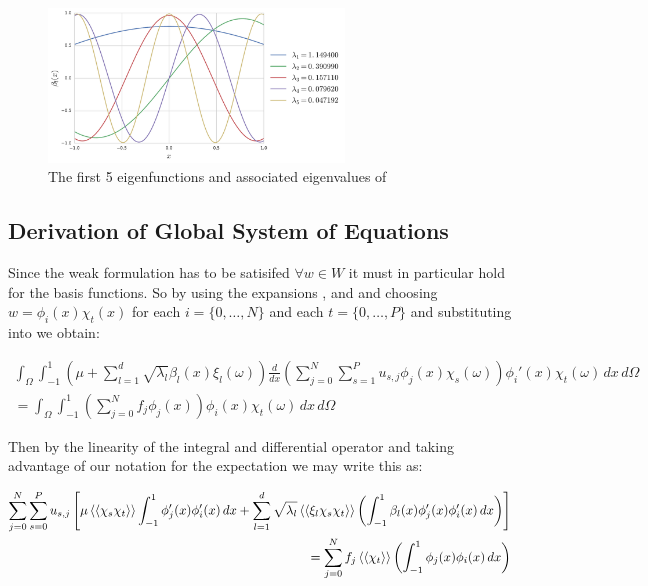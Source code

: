 \begin{figure}
    \centering
    \includegraphics[width=0.7\textwidth]{img/kle-eigenfunctions.pdf}
    \caption{The first 5 eigenfunctions and associated eigenvalues of
             }
    \label{fig:kle-eigenfunctions}
\end{figure}

\subsection{Derivation of Global System of Equations}

Since the weak formulation  has to be satisifed
$\forall w \in W$ it must in particular hold for the basis functions. So by
using the expansions ,
 and  and
choosing $w = \phi_i(x)\chi_t(x)$ for each $i = \{0,\ldots,N\}$ and each $t =
\{0,\ldots,P\}$ and substituting into  we
obtain:

\begin{align*}
    \int_{\Omega}\int_{-1}^1
      \left(\mu + \sum_{l=1}^d\sqrt{\lambda_l}\beta_l(x)\xi_l(\omega)\right)
      \frac{d}{dx}\left(\sum_{j=0}^N\sum_{s=1}^Pu_{s,j}\phi_j(x)\chi_s(\omega)\right)
      \phi_i'(x)\chi_t(\omega)\, dx\, d\Omega \\ =
    \int_{\Omega}\int_{-1}^1
      \left(\sum_{j=0}^Nf_j\phi_j(x)\right)
      \phi_i(x)\chi_t(\omega)\, dx\, d\Omega
\end{align*}

Then by the linearity of the integral and differential operator and taking
advantage of our notation for the expectation
 we may write this as:

\begin{align}\label{eq:oned-stochastic-discrete}
  \begin{split}
      \sum_{j=0}^N\sum_{s=0}^Pu_{s,j}\left[
          \mu\left\langle\langle\chi_s\chi_t\right\rangle\rangle
          \int_{-1}^1\phi_j'(x)\phi_i'(x)\, dx +
          \sum_{l=1}^d\sqrt{\lambda_l}\left\langle\langle\xi_l\chi_s\chi_t\right\rangle\rangle
          \left(\int_{-1}^1 \beta_l(x)\phi_j'(x)\phi_i'(x)\, dx\right)
      \right]\\ =
      \sum_{j=0}^Nf_j\left\langle\langle\chi_t\right\rangle\rangle
          \left(\int_{-1}^1\phi_j(x)\phi_i(x)\, dx\right)
  \end{split}
\end{align}

